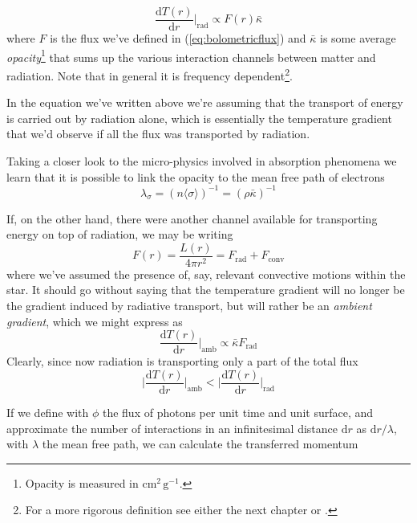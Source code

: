 \begin{equation*}
	\frac{\text{d}T(r)}{\text{d}r}\Big|_{\text{rad}} \propto F(r)\bar{\kappa}
\end{equation*}
where $F$ is the flux we've defined in (\ref{eq:bolometricflux}) and $\bar{\kappa}$ is some average \emph{opacity}\footnote{Opacity is measured in $\text{cm}^{2}\,\text{g}^{-1}$.} that sums up the various interaction channels between matter and radiation. Note that in general it is frequency dependent\footnote{For a more rigorous definition see either the next chapter or \cite{1986rpa..book.....R}.}.
\par In the equation we've written above we're assuming that the transport of energy is carried out by radiation alone, which is essentially the temperature gradient that we'd observe if all the flux was transported by radiation.
\par Taking a closer look to the micro-physics involved in absorption phenomena we learn that it is possible to link the opacity to the mean free path of electrons
\begin{equation*}
	\lambda_{\sigma} = (n\langle\sigma\rangle)^{-1} = (\rho\bar{\kappa})^{-1}
\end{equation*}
\par If, on the other hand, there were another channel available for transporting energy on top of radiation, we may be writing
\begin{equation*}
	F(r) = \frac{L(r)}{4\pi r^{2}} = F_{\text{rad}}+F_{\text{conv}}
\end{equation*}
where we've assumed the presence of, say, relevant convective motions within the star. It should go without saying that the temperature gradient will no longer be the gradient induced by radiative transport, but will rather be an \emph{ambient gradient}, which we might express as 
\begin{equation*}
	\frac{\text{d}T(r)}{\text{d}r}\Big|_{\text{amb}} \propto \bar{\kappa}F_{\text{rad}}
\end{equation*}
Clearly, since now radiation is transporting only a part of the total flux
\begin{equation*}
	\Big|\frac{\text{d}T(r)}{\text{d}r}\Big|_{\text{amb}} < \Big|\frac{\text{d}T(r)}{\text{d}r}\Big|_{\text{rad}}
\end{equation*}
\par If we define with $\phi$ the flux of photons per unit time and unit surface, and approximate the number of interactions in an infinitesimal distance $\text{d}r$ as $\text{d}r/\lambda$, with $\lambda$ the mean free path, we can calculate the transferred momentum
